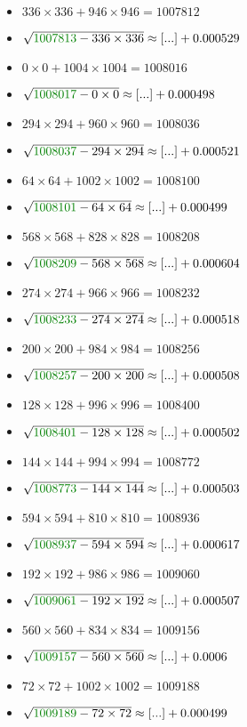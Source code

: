 \documentclass[12pt]{article}
\begin{document}
\begin{multicols}{2}
\begin{itemize}
\item $336×336 + 946×946 = 1007812$
\item $\sqrt{ {\color{green!50!black}{1007813}} - 336\times 336 } \approx [...] + 0.000529$
\item $0×0 + 1004×1004 = 1008016$
\item $\sqrt{ {\color{green!50!black}{1008017}} - 0\times 0 } \approx [...] + 0.000498$
\item $294×294 + 960×960 = 1008036$
\item $\sqrt{ {\color{green!50!black}{1008037}} - 294\times 294 } \approx [...] + 0.000521$
\item $64×64 + 1002×1002 = 1008100$
\item $\sqrt{ {\color{green!50!black}{1008101}} - 64\times 64 } \approx [...] + 0.000499$
\item $568×568 + 828×828 = 1008208$
\item $\sqrt{ {\color{green!50!black}{1008209}} - 568\times 568 } \approx [...] + 0.000604$
\item $274×274 + 966×966 = 1008232$
\item $\sqrt{ {\color{green!50!black}{1008233}} - 274\times 274 } \approx [...] + 0.000518$
\item $200×200 + 984×984 = 1008256$
\item $\sqrt{ {\color{green!50!black}{1008257}} - 200\times 200 } \approx [...] + 0.000508$
\item $128×128 + 996×996 = 1008400$
\item $\sqrt{ {\color{green!50!black}{1008401}} - 128\times 128 } \approx [...] + 0.000502$
\item $144×144 + 994×994 = 1008772$
\item $\sqrt{ {\color{green!50!black}{1008773}} - 144\times 144 } \approx [...] + 0.000503$
\item $594×594 + 810×810 = 1008936$
\item $\sqrt{ {\color{green!50!black}{1008937}} - 594\times 594 } \approx [...] + 0.000617$
\item $192×192 + 986×986 = 1009060$
\item $\sqrt{ {\color{green!50!black}{1009061}} - 192\times 192 } \approx [...] + 0.000507$
\item $560×560 + 834×834 = 1009156$
\item $\sqrt{ {\color{green!50!black}{1009157}} - 560\times 560 } \approx [...] + 0.0006$
\item $72×72 + 1002×1002 = 1009188$
\item $\sqrt{ {\color{green!50!black}{1009189}} - 72\times 72 } \approx [...] + 0.000499$

\end{itemize}
\end{multicols}
\end{document}
